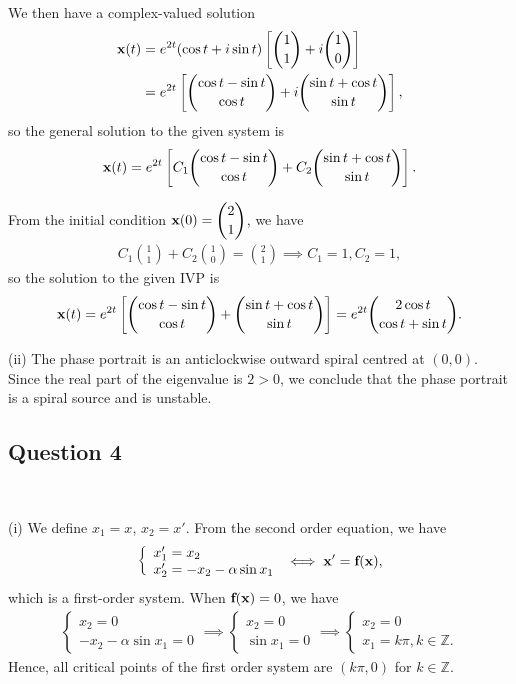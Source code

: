 \documentclass[12pt]{amsart}
\theoremstyle{plain}
\theoremstyle{definition}
\def\mb{\mathbb}
\def\bf{\textbf}
\newcommand{\RA}{\implies}
\begin{document}
We then have a complex-valued solution
\begin{align*}
	\bf x(t)&=e^{2t}(\cos t+i\sin t)\left[\binom11+i\binom 10\right]\\
		&=e^{2t}\left[\binom{\cos t-\sin t}{\cos t}+i\binom{\sin t+\cos t}{\sin t}\right],
\end{align*}
so the general solution to the given system is
\begin{align*}
	\bf x(t)=e^{2t}\left[C_1\binom{\cos t-\sin t}{\cos t}+C_2\binom{\sin t+\cos t}{\sin t}\right].
\end{align*}

From the initial condition $\displaystyle \bf x(0)=\binom21$, we have
\begin{align*}
	C_1\binom11+C_2\binom10= \binom21\RA C_1=1,C_2=1,
\end{align*}
so the solution to the given IVP is
\begin{align*}
	\bf x(t)=e^{2t}\left[\binom{\cos t-\sin t}{\cos t}+\binom{\sin t+\cos t}{\sin t}\right]=e^{2t}\binom{2\cos t}{\cos t+\sin t}.
\end{align*}

(ii) The phase portrait is an anticlockwise outward spiral centred at $(0,0)$. Since the real part of the eigenvalue is $2>0$, we conclude that the phase portrait is a spiral source and is unstable.

\subsection*{Question 4} \ 

(i) We define $x_1=x$, $x_2=x'$. From the second order equation, we have
\begin{align*}
	\left\{
	\begin{array}{l}
		x_1'=x_2\\
		x_2'=-x_2-\alpha\sin x_1
	\end{array}
	\right.\iff \bf x'=\bf f(\bf x),
\end{align*}
which is a first-order system. When $\bf f(\bf x)=0$, we have
\begin{align*}
	\left\{
	\begin{array}{l}
		x_2=0\\
		-x_2-\alpha\sin x_1=0
	\end{array}
	\right.\RA\left\{
	\begin{array}{l}
		x_2=0\\
		\sin x_1=0
	\end{array}
	\right.\RA\left\{
	\begin{array}{l}
		x_2=0\\
		x_1=k\pi,k\in\mb Z.
	\end{array}
	\right.
\end{align*}
Hence, all critical points of the first order system are $(k\pi,0)$ for $k\in\mb Z$.
\end{document}
